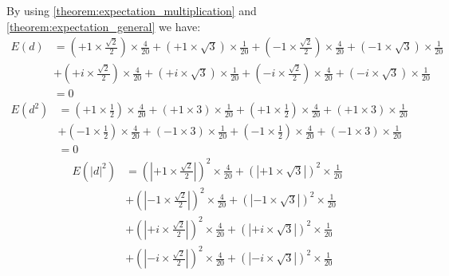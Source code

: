 \begin{Proof}
	By using \cref{theorem:expectation_multiplication} and \cref{theorem:expectation_general} we have:
	\begin{equation*}
		\begin{split}
		E(d) &= \left(+1 \times \frac{\sqrt{2}}{2}\right) \times \frac{4}{20} + \left(+1 \times \sqrt{3}\right) \times \frac{1}{20}+\left(-1 \times \frac{\sqrt{2}}{2}\right) \times \frac{4}{20}+\left(-1 \times \sqrt{3}\right) \times \frac{1}{20}\\
		     &+ \left(+i \times \frac{\sqrt{2}}{2}\right) \times \frac{4}{20} + \left(+i \times \sqrt{3}\right) \times \frac{1}{20}+\left(-i \times \frac{\sqrt{2}}{2}\right) \times \frac{4}{20}+\left(-i \times \sqrt{3}\right) \times \frac{1}{20}\\ 
			 &= 0
		\end{split}
	  \end{equation*}
	  \begin{equation*}
		\begin{split}
		E(d^2) &= \left(+1 \times \frac{1}{2}\right) \times \frac{4}{20} + \left(+1 \times 3\right) \times \frac{1}{20}+\left(+1 \times \frac{1}{2}\right) \times \frac{4}{20}+\left(+1 \times 3\right) \times \frac{1}{20}\\
		     &+ \left(-1 \times \frac{1}{2}\right) \times \frac{4}{20} + \left(-1 \times 3\right) \times \frac{1}{20}+\left(-1 \times \frac{1}{2}\right) \times \frac{4}{20}+\left(-1 \times 3\right) \times \frac{1}{20}\\ 
			 &= 0
		\end{split}
	 \end{equation*}
	 \begin{equation*}
		\begin{split}
		E(\left|d\right|^2) &= \left(\left|+1 \times \frac{\sqrt{2}}{2} \right|\right)^2\times \frac{4}{20} + \left(\left|+1 \times \sqrt{3}\right|\right)^2\times \frac{1}{20}\\
		                    &+\left(\left|-1 \times \frac{\sqrt{2}}{2}\right|\right)^2\times \frac{4}{20}+\left(\left|-1 \times \sqrt{3}\right|\right)^2\times \frac{1}{20}\\
		                    &+ \left(\left|+i \times \frac{\sqrt{2}}{2}\right|\right)^2\times \frac{4}{20} + \left(\left|+i \times \sqrt{3}\right|\right)^2\times \frac{1}{20}\\
							&+\left(\left|-i \times \frac{\sqrt{2}}{2}\right|\right)^2\times \frac{4}{20}+\left(\left|-i \times \sqrt{3}\right|\right)^2\times \frac{1}{20}\\ 

\end{split}
\end{equation*}
\end{Proof}
